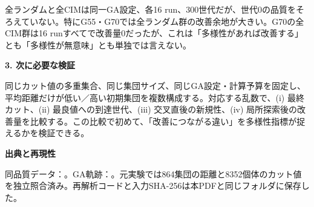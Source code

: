 \documentclass[11pt,a4paper,landscape]{article}
\begin{document}
全ランダムと全CIMは同一GA設定、各16 run、300世代だが、世代0の品質をそろえていない。特にG55・G70では全ランダム群の改善余地が大きい。G70の全CIM群は16 runすべてで改善量0だったが、これは「多様性があれば改善する」とも「多様性が無意味」とも単独では言えない。

\textbf{3. 次に必要な検証}

同じカット値の多重集合、同じ集団サイズ、同じGA設定・計算予算を固定し、平均距離だけが低い／高い初期集団を複数構成する。対応する乱数で、(i) 最終カット、(ii) 最良値への到達世代、(iii) 交叉直後の新規性、(iv) 局所探索後の改善量を比較する。この比較で初めて、「改善につながる違い」を多様性指標が捉えるかを検証できる。

\textbf{出典と再現性}

同品質データ：。GA軌跡：。元実験では864集団の距離と8352個体のカット値を独立照合済み。再解析コードと入力SHA-256は本PDFと同じフォルダに保存した。
\end{document}
